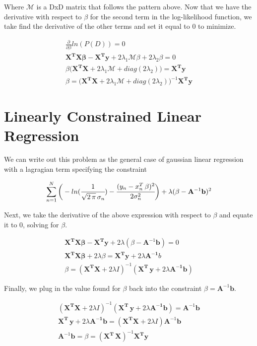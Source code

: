 \documentclass[12pt]{article}
\begin{document}
\begin{enumerate}[label=\alph*.]
	Where $\mathcal{M}$ is a DxD matrix that follows the pattern above. Now that we have the derivative with respect to $\beta$ for the second term in the log-likelihood function, we take find the derivative of the other terms and set it equal to 0 to minimize.

	\begin{gather*}
		\frac{\partial}{\partial \beta} ln (P (D)) = 0 \\
		\mathbf{X^T X \beta} - \mathbf{X^T y} + 2 \lambda_1  \mathbf{\mathcal{M}} \beta + 2 \lambda_2 \beta = 0 \\
		\beta \big( \mathbf{X^T X} + 2 \lambda_1  \mathbf{\mathcal{M}} + diag(2 \lambda_2) \big) = \mathbf{X^T y} \\
		\beta = \big( \mathbf{X^T X} + 2 \lambda_1  \mathbf{\mathcal{M}} + diag(2 \lambda_2) \big)^{-1} \mathbf{X^T y}
	\end{gather*}
\end{enumerate}

\section{Linearly Constrained Linear Regression}

	We can write out this problem as the general case of gaussian linear regression with a lagragian term specifying the constraint

	\begin{gather*}
		\sum_{n=1}^N{ \bigg( - ln( \cfrac{1}{\sqrt{2 \, \pi} \, \sigma_n} ) - \cfrac{ (y_n - x_n^T \, \beta)^2 }{ 2 \sigma_n^2 } \bigg) } + \lambda ( \beta - \mathbf{A}^{-1}\mathbf{b} )^2
	\end{gather*}

	Next, we take the derivative of the above expression with respect to $\beta$ and equate it to 0, solving for $\beta$.

	\begin{gather*}
		\mathbf{X^T X \beta} - \mathbf{X^T y} + 2 \lambda ( \beta - \mathbf{A}^{-1}\mathbf{b} ) = 0 \\
		\mathbf{X^T X \beta} + 2 \lambda \beta = \mathbf{X^T y} + 2 \lambda \mathbf{A^{-1}} b \\
		\beta = (\mathbf{X^T X} + 2 \lambda I)^{-1} (\mathbf{X^T \, y}  + 2 \lambda \mathbf{A^{-1} b})
	\end{gather*}

	Finally, we plug in the value found for $\beta$ back into the constraint $\beta = \mathbf{A}^{-1}\mathbf{b}$.

	\begin{gather*}
		(\mathbf{X^T X} + 2 \lambda I)^{-1} (\mathbf{X^T \, y}  + 2 \lambda \mathbf{A^{-1} b}) = \mathbf{A}^{-1}\mathbf{b} \\
		\mathbf{X^T \, y}  + 2 \lambda \mathbf{A^{-1} b} = (\mathbf{X^T X} + 2 \lambda I) \mathbf{A}^{-1}\mathbf{b} \\
		 \mathbf{A}^{-1}\mathbf{b} = \beta = (\mathbf{X^T \, X})^{-1} \mathbf{X^T} \mathbf{y}
	\end{gather*}
\end{document}
